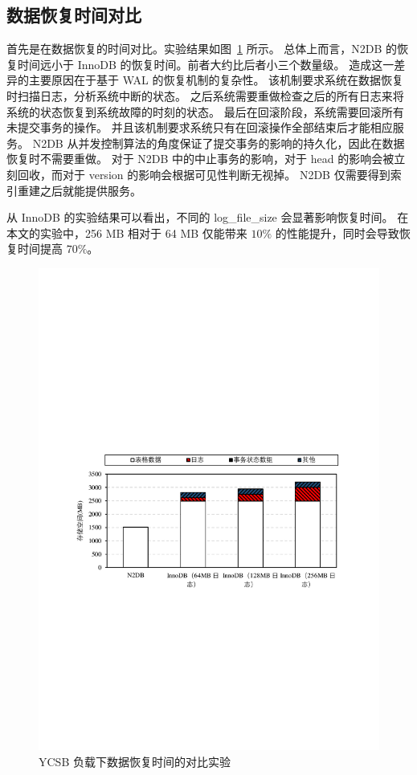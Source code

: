 \subsection{数据恢复时间对比}

首先是在数据恢复的时间对比。实验结果如图~\ref{fig:recovery-time-ycsb} 所示。
总体上而言，N2DB 的恢复时间远小于 InnoDB 的恢复时间。前者大约比后者小三个数量级。
造成这一差异的主要原因在于基于 WAL 的恢复机制的复杂性。
该机制要求系统在数据恢复时扫描日志，分析系统中断的状态。
之后系统需要重做检查之后的所有日志来将系统的状态恢复到系统故障的时刻的状态。
最后在回滚阶段，系统需要回滚所有未提交事务的操作。
并且该机制要求系统只有在回滚操作全部结束后才能相应服务。
N2DB 从并发控制算法的角度保证了提交事务的影响的持久化，因此在数据恢复时不需要重做。
对于 N2DB 中的中止事务的影响，对于 head 的影响会被立刻回收，而对于 version 的影响会根据可见性判断无视掉。
N2DB 仅需要得到索引重建之后就能提供服务。

从 InnoDB 的实验结果可以看出，不同的 log\_file\_size 会显著影响恢复时间。
在本文的实验中，256 MB 相对于 64 MB 仅能带来 $10\%$ 的性能提升，同时会导致恢复时间提高 $70\%$。


\begin{figure}
    \centering
    \includegraphics[width=15cm, trim={1cm 9cm 1cm 10cm}]{figures/recovery-time.pdf}
    \caption{YCSB 负载下数据恢复时间的对比实验}
    \label{fig:recovery-time-ycsb}
\end{figure}

